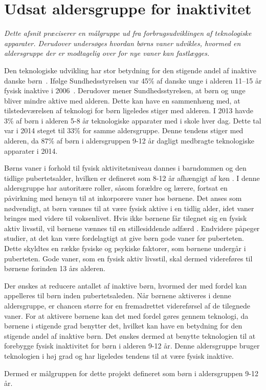 \section{Udsat aldersgruppe for inaktivitet} \label{sec:maalgruppe}
\textit{Dette afsnit præciserer en målgruppe ud fra forbrugsudviklingen af teknologiske apparater. Derudover undersøges hvordan børns vaner udvikles, hvormed en aldersgruppe der er modtagelig over for nye vaner kan fastlægges.}

Den teknologiske udvikling har stor betydning for den stigende andel af inaktive danske børn~\citep{Kiens2007}. Ifølge Sundhedsstyrelsen var 45\% af danske unge i alderen 11–15 år fysisk inaktive i 2006~\citep{Sundhedsstyrelsen2006}. Derudover mener Sundhedsstyrelsen, at børn og unge bliver mindre aktive med alderen. Dette kan have en sammenhæng med, at tilstedeværelsen af teknologi for børn ligeledes stiger med alderen. 
I 2013 havde 3\% af børn i alderen 5-8 år teknologiske apparater med i skole hver dag. Dette tal var i 2014 steget til 33\% for samme aldersgruppe. Denne tendens stiger med alderen, da 87\% af børn i aldersgruppen 9-12 år dagligt medbragte teknologiske apparater i 2014.~\citep{Sundhedsstyrelsen2006,GjensidigeForsikring2014} 

Børns vaner i forhold til fysisk aktivitetsniveau dannes i barndommen og den tidlige pubertetsalder, hvilken er defineret som 8-12 år afhængigt af køn \citep{Wied2011}. I denne aldersgruppe har autoritære roller, såsom forældre og lærere, fortsat en påvirkning med hensyn til at inkorporere vaner hos børnene. \citep{Wied2011,F.SallisG.Simons-MortonJ.Stone1992,L.MeyerP.Gullotta2012} \newline
Det anses som nødvendigt, at børn vænnes til at være fysisk aktive i en tidlig alder, idet vaner bringes med videre til voksenlivet. Hvis ikke børnene får tilegnet sig en fysisk aktiv livsstil, vil børnene vænnes til en stillesiddende adfærd \citep{Nabe-NielsenSundhedsministerietetal.2005}. Endvidere påpeger studier, at det kan være fordelagtigt at give børn gode vaner før puberteten. Dette skyldtes en række fysiske og psykiske faktorer, som børnene undergår i puberteten. Gode vaner, som en fysisk aktiv livsstil, skal dermed videreføres til børnene forinden 13 års alderen. \citep{F.SallisG.Simons-MortonJ.Stone1992,L.MeyerP.Gullotta2012,P.J.KremersBrug2008}

Der ønskes at reducere antallet af inaktive børn, hvormed der med fordel kan appelleres til børn inden pubertetsaleden. Når børnene aktiveres i denne aldersgruppe, er chancen større for en fremadrettet videreførsel af de tilegnede vaner. For at aktivere børnene kan det med fordel gøres gennem teknologi, da børnene i stigende grad benytter det, hvilket kan have en betydning for den stigende andel af inaktive børn. Det ønskes dermed at benytte teknologien til at forebygge fysisk inaktivitet for børn i alderen 9-12 år. Denne aldersgruppe bruger teknologien i høj grad og har ligeledes tendens til at være fysisk inaktive. 

Dermed er målgruppen for dette projekt defineret som børn i aldersgruppen 9-12 år.